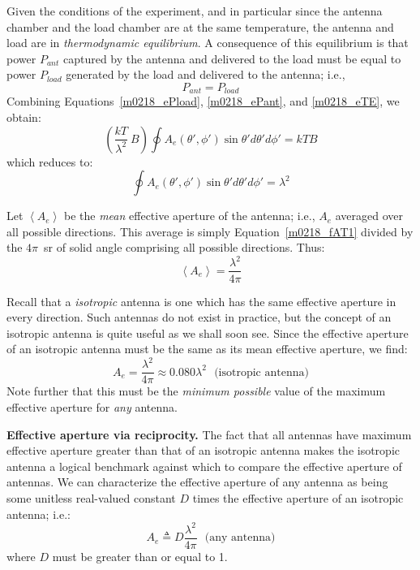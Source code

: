 Given the conditions of the experiment, and in particular since the antenna chamber and the load chamber are at the same temperature, the antenna and load are in \emph{thermodynamic equilibrium}.
A consequence of this equilibrium is that power $P_{ant}$ captured by the antenna and delivered to the load must be equal to power $P_{load}$ generated by the load and delivered to the antenna; i.e., 
%
\begin{equation}
P_{ant} = P_{load} 
\label{m0218_eTE}
\end{equation}
%
Combining Equations~\ref{m0218_ePload}, \ref{m0218_ePant}, and \ref{m0218_eTE}, we obtain:
%
\begin{equation}
\left(\frac{kT}{\lambda^2}~B \right) \oint { A_e(\theta',\phi') \sin\theta' d\theta' d\phi'  } = kTB
\end{equation}
%
which reduces to:
%
\begin{equation}
\oint { A_e(\theta',\phi') \sin\theta' d\theta' d\phi'  } = \lambda^2
\label{m0218_fAT1}
\end{equation}

Let $\left<A_e\right>$ be the \emph{mean} effective aperture of the antenna; i.e., $A_e$ averaged over all possible directions.
This average is simply Equation~\ref{m0218_fAT1} divided by the $4\pi$~sr of solid angle comprising all possible directions.  Thus:
%
\begin{equation}
\left<A_e\right> = \frac{\lambda^2}{4\pi}
\end{equation}

Recall that a \emph{isotropic} antenna
is one which has the same effective aperture in every direction.
Such antennas do not exist in practice, but the concept of an isotropic antenna is quite useful as we shall soon see.
Since the effective aperture of an isotropic antenna must be the same as its mean effective aperture, we find:  
%
\begin{equation}
\boxed{
A_e = \frac{\lambda^2}{4\pi} \approx 0.080\lambda^2 ~~~\mbox{(isotropic antenna)}
}
\end{equation}
%
Note further that this must be the \emph{minimum possible} value of the maximum effective aperture for \emph{any} antenna.

{\bf Effective aperture via reciprocity.}
The fact that all antennas have maximum effective aperture greater than that of an isotropic antenna makes the isotropic antenna a logical benchmark against which to compare the effective aperture of antennas.
We can characterize the effective aperture of any antenna as being some unitless real-valued constant $D$ times the effective aperture of an isotropic antenna; i.e.:
%
\begin{equation}
\boxed{
A_e \triangleq D \frac{\lambda^2}{4\pi} ~~~\mbox{(any antenna)}
}
\label{m0218_eAe1}
\end{equation}
%
where $D$ must be greater than or equal to 1.

